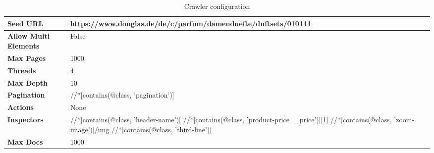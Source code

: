 {\begin{table}[ht] 
{\footnotesize
\begin{tabular}{ P{3cm} ||P{10.1cm}  }      %
 \hline \hline
\textbf{Seed URL} & \href{https://www.douglas.de/de/c/parfum/damenduefte/duftsets/010111}{https://www.douglas.de/de/c/parfum/damenduefte/duftsets/010111}\T\B 
\\ 
\hline
\textbf{Allow Multi Elements} & False \T\B 
\\ 
\hline
\textbf{Max Pages} & 1000\T\B 
\\ 
\hline
\textbf{Threads} & 4\T\B 
\\ 
\hline
\textbf{Max Depth} & 10\T\B 
\\ 
\hline
\textbf{Pagination} & //*[contains(@class, 'pagination')]\T\B 
\\ 
\hline
\textbf{Actions} & None\T\B 
\\ 
\hline
\textbf{Inspectors} & //*[contains(@class, 'header-name')]\T\B  \newline
//*[contains(@class, 'product-price\_\_price')][1] \newline
//*[contains(@class, 'zoom-image')]/img \newline
//*[contains(@class, 'third-line')] 
\\ 
\hline
\textbf{Max Docs} & 1000\T\B 
\\ 
\hline \hline
    \end{tabular}
}
  \captionsetup{justification=centering,margin=2cm}
  \caption{Crawler configuration}
\end{table}



}
